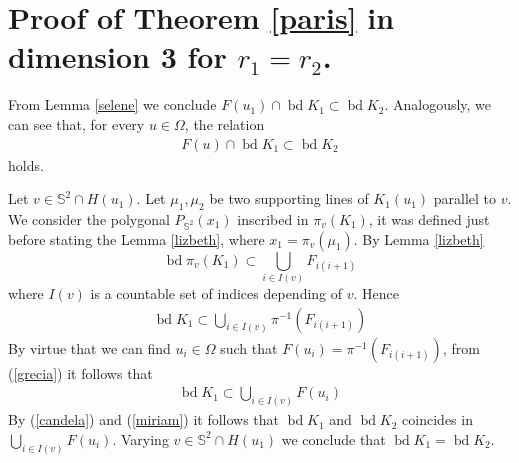 \documentclass[12pt]{amsart}
\newcommand{\bd}{\operatorname*{bd}}
\begin{document}
\section{Proof of Theorem \ref{paris} in dimension 3 for $r_1=r_2$.}
From Lemma \ref{selene} we conclude $F(u_1) \cap \bd K_1\subset \bd K_2$. Analogously, we can see that, for every $u\in \Omega$, the relation  
\begin{eqnarray}\label{candela}
F(u)\cap \bd K_1\subset \bd K_2
\end{eqnarray} 
holds.

Let $v\in \mathbb{S}^2 \cap H(u_1)$. Let $\mu_1,\mu_2$ be two supporting lines of $K_1(u_1)$ parallel to $v$. We consider the polygonal $P_{\mathbb{S}^2}(x_1)$ inscribed in $\pi_v(K_1)$, it was defined just before stating the Lemma \ref{lizbeth}, where $x_1=\pi_v(\mu_1)$. By Lemma \ref{lizbeth}
\[
\bd \pi_v(K_1)\subset \bigcup_{i\in I(v)} F_{i(i+1)}
\]
where $I(v)$ is a countable set of indices depending of $v$.
Hence
\begin{eqnarray}\label{grecia}
  \bd K_1\subset \bigcup_{i\in I(v)} \pi^{-1}(F_{i(i+1)})
\end{eqnarray}
By virtue that we can find $u_i\in \Omega$ such that $F(u_i)=\pi^{-1}(F_{i(i+1)})$, from (\ref{grecia}) it follows that
\begin{eqnarray}\label{miriam}
\bd K_1\subset \bigcup_{i\in I(v)} F(u_i)
\end{eqnarray}
By (\ref{candela}) and (\ref{miriam}) it follows that $\bd K_1$ and $\bd K_2$ coincides in $\bigcup_{i\in I(v)} F(u_i)$.
Varying $v\in \mathbb{S}^2\cap H(u_1)$ we conclude that $\bd K_1=\bd K_2$.
\end{document}
